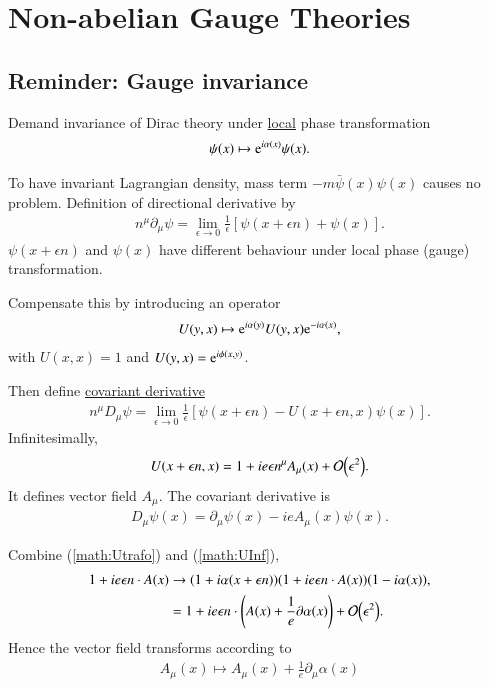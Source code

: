 \chapter{Non-abelian Gauge Theories}

\section{Reminder: Gauge invariance}
Demand invariance of Dirac theory under \underline{local} phase transformation
\begin{align*}
   \psi (x) \mapsto \mathrm{e}^{i\alpha(x)}\psi(x).
\end{align*}

To have invariant Lagrangian density, mass term $- m \bar\psi (x) \psi (x)$ causes no problem. Definition of directional derivative by
\begin{align}
   n^\mu \partial_\mu \psi = \lim_{\epsilon \rightarrow 0} \frac{1}{\epsilon} \left[ \psi(x+\epsilon n) + \psi(x) \right].
\end{align}
$\psi(x+\epsilon n )$ and $\psi(x)$ have different behaviour under local phase (gauge) transformation. 

Compensate this by introducing an operator
\begin{align}
   U(y , x) \mapsto \mathrm{e}^{i\alpha(y)} U(y,x) \mathrm{e}^{-i\alpha(x)}, \label{math:Utrafo}
\end{align}
with $U(x,x) = 1$ and $U(y,x) = \mathrm{e}^{i\phi(x,y)}$.

Then define \underline{covariant derivative}
\begin{align}
   n^\mu D_\mu \psi = \lim_{\epsilon \rightarrow 0} \frac{1}{\epsilon} \left[ \psi(x + \epsilon n ) - U(x+\epsilon n, x) \psi(x) \right].
\end{align}
Infinitesimally,
\begin{align}
   U(x+\epsilon n , x) = 1+ ie \epsilon n^\mu A_\mu (x) + \order{\epsilon^2}. \label{math:UInf}
\end{align}
It defines vector field $A_\mu$. The covariant derivative is 
\begin{align}
   D_\mu \psi (x) = \partial_\mu \psi (x) - ie A_\mu (x) \psi (x).
\end{align}

Combine (\ref{math:Utrafo}) and (\ref{math:UInf}), 
\begin{align*}
   1 + i e \epsilon n \cdot A(x) &\rightarrow ( 1 + i\alpha(x + \epsilon n)) (1 + ie \epsilon n \cdot A(x)) (1 - i\alpha(x)), \\
                                 & = 1+ ie \epsilon n \cdot  \left( A(x) + \frac{1}{e} \partial\alpha(x) \right) + \order{\epsilon^2}.
\end{align*}
Hence the vector field transforms according to
\begin{align}
   A_\mu (x) \mapsto A_\mu (x) + \frac{1}{e } \partial_\mu \alpha(x)
\end{align} 

